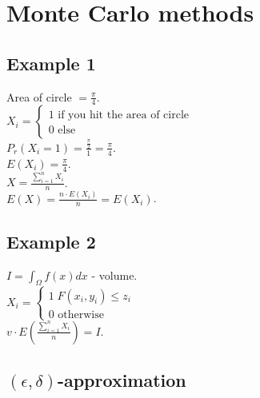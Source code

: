\documentclass[a4paper, 12pt]{book}
\theoremstyle{definition}
\theoremstyle{remark}
\begin{document}
\chapter{Monte Carlo methods}


\section{Example 1}

Area of circle $= \frac{\pi}{4}$. \\
$X_i = \begin{cases}
  1 \text{ if you hit the area of circle} \\
  0 \text{ else}
\end{cases}$ \\
$P_r(X_i = 1) = \frac{\frac{\pi}{2}}{1} = \frac{\pi}{4}$. \\
$E(X_i) = \frac{\pi}{4}$. \\
$X = \frac{\sum_{i=1}^{n} X_i}{n}$. \\
$E(X) = \frac{n \cdot E(X_i)}{n} = E(X_i)$.



\section{Example 2}

$I = \int_{\Omega} f(x) dx$ - volume. \\
$X_i = \begin{cases}
  1 \; F(x_i,y_i) \leq z_i \\
  0 \text{ otherwise}
\end{cases}$ \\
$v \cdot E\left(\frac{\sum_{i=1}^{n} X_i}{n}\right) = I$.


\section{$(\epsilon,\delta)$-approximation}
\end{document}

